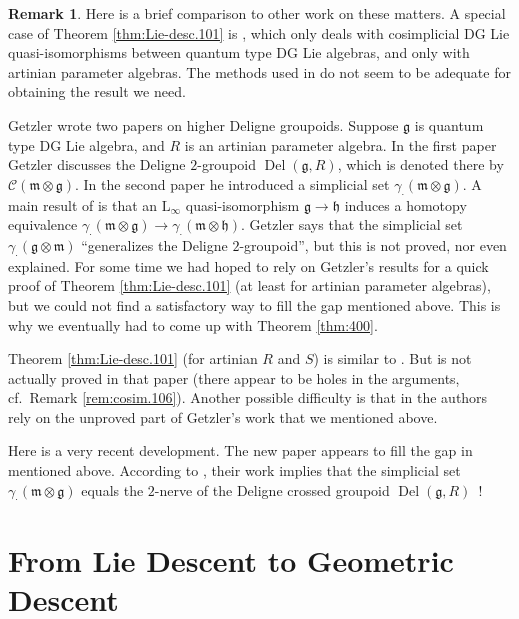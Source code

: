\documentclass[a4paper, 10pt]{amsart}
\theoremstyle{definition}
\newtheorem{rem}[equation]{Remark}
\numberwithin{equation}{section}
\newcommand{\opn}{\operatorname}
\newcommand{\bdot}{\bsym{\cdot}}
\newcommand{\mfrak}[1]{\mathfrak{#1}}
\newcommand{\mcal}[1]{\mathcal{#1}}
\newcommand{\mrm}[1]{\mathrm{#1}}
\newcommand{\bsym}[1]{\boldsymbol{#1}}
\newcommand{\ot}{\otimes}
\newcommand{\g}{\mfrak{g}}
\newcommand{\m}{\mfrak{m}}
\newcommand{\h}{\mfrak{h}}
\newcommand{\ga}{\gamma}
\begin{document}
\begin{rem} \label{rem:Lie-desc.101}
Here is a brief comparison to other work on these matters. 
A special case of Theorem \ref{thm:Lie-desc.101} is 
\cite[Proposition 3.3.1]{BGNT1}, which only deals with cosimplicial DG Lie
quasi-isomorphisms between quantum type DG Lie algebras, and only with artinian
parameter algebras. The methods used in \cite{BGNT1} do not seem to be adequate
for obtaining the result we need. 

Getzler wrote two papers \cite{Ge1, Ge2} on higher Deligne groupoids. 
Suppose $\g$ is quantum type DG Lie algebra, and $R$ is an artinian parameter
algebra. In the first paper Getzler discusses the Deligne $2$-groupoid
$\opn{Del}(\g, R)$, which is denoted there by $\mcal{C}(\m \ot \g)$.  In the
second paper he introduced a simplicial set $\ga_{\bdot}(\m \ot \g)$.
A main result of \cite{Ge2} is that  an $\mrm{L}_{\infty}$ quasi-isomorphism 
$\g \to \h$ induces a homotopy equivalence 
$\ga_{\bdot}(\m \ot \g) \to \ga_{\bdot}(\m \ot \h)$.
Getzler says that the simplicial set $\ga_{\bdot}(\g \ot \m)$ ``generalizes the
Deligne $2$-groupoid'', but this is not proved, nor even explained.
For some time we had hoped to rely on Getzler's results for a quick proof of 
Theorem \ref{thm:Lie-desc.101} (at least for artinian parameter algebras), but
we could not find a satisfactory way to fill the gap mentioned above.
This is why we eventually had to come up with  Theorem \ref{thm:400}. 

Theorem \ref{thm:Lie-desc.101} (for artinian $R$ and $S$) is similar to 
\cite[Theorem 3.5]{CH}. But \cite[Theorem 3.5]{CH} is not actually proved in
that paper (there appear to be holes in the arguments, cf.\ Remark
\ref{rem:cosim.106}). Another possible difficulty is that in \cite{CH} the
authors rely on the unproved part of Getzler's work that we mentioned above. 

Here is a very recent development. The new paper \cite{BGNT3} appears to fill
the gap in \cite{Ge2}
mentioned above. According to \cite[Remark 1.1]{BGNT3}, their work implies that
the simplicial set $\ga_{\bdot}(\m \ot \g)$ equals the $2$-nerve of the 
Deligne crossed groupoid $\opn{Del}(\g, R)$~!
\end{rem}






\section{From Lie Descent to Geometric Descent}
\label{sec:Lie-Geo}
\end{document}
